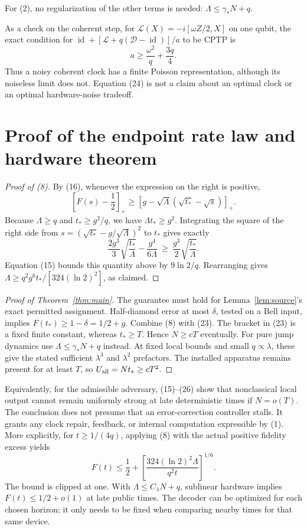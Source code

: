 \documentclass[11pt]{article}
\newcommand{\id}{\operatorname{id}}
\newcommand{\D}{\mathcal D}
\begin{document}
For (2), no regularization of the other terms is needed:
\(\Lambda\leq\gamma_*N+q\).

As a check on the coherent step, for
\(\mathcal L(X)=-i[\omega Z/2,X]\) on one qubit, the exact condition for
\(\id+[\mathcal L+q(\D-\id)]/a\) to be CPTP is
\[
 a\geq\frac{\omega^2}{q}+\frac{3q}{4}.
 \tag{24}
\]
Thus a noisy coherent clock has a finite Poisson representation, although
its noiseless limit does not. Equation (24) is not a claim about an
optimal clock or an optimal hardware-noise tradeoff.

\section{Proof of the endpoint rate law and hardware theorem}

\begin{proof}[Proof of (8)]
By (16), whenever the expression on the right is positive,
\[
 \left[F(s)-\frac12\right]_+
    \geq \left[g-\sqrt{\Lambda}(\sqrt{t_*}-\sqrt s)\right]_+.
 \tag{25}
\]
Because \(\Lambda\geq q\) and \(t_*\geq g^2/q\), we have
\(\Lambda t_*\geq g^2\). Integrating the square of the right side
from \(s=(\sqrt{t_*}-g/\sqrt{\Lambda})^2\) to \(t_*\) gives exactly
\[
 \frac{2g^3}{3}\sqrt{\frac{t_*}{\Lambda}}
             -\frac{g^4}{6\Lambda}
 \ \geq\ \frac{g^3}{2}\sqrt{\frac{t_*}{\Lambda}}.
 \tag{26}
\]
Equation (15) bounds this quantity above by \(9\ln2/q\).
Rearranging gives
\(\Lambda\geq q^2g^6t_*/[324(\ln2)^2]\), as claimed.
\end{proof}

\begin{proof}[Proof of Theorem~\ref{thm:main}]
The guarantee must hold for Lemma~\ref{lem:source}'s exact permitted
assignment. Half-diamond error at most \(\delta\), tested on a Bell
input, implies \(F(t_*)\geq1-\delta=1/2+g\).
Combine (8) with (23). The bracket in (23) is a fixed finite constant,
whereas \(t_*\geq T\). Hence \(N\geq cT\) eventually.
For pure jump dynamics use \(\Lambda\leq\gamma_*N+q\) instead.
At fixed local bounds and small \(q\propto\lambda\), these give the
stated sufficient \(\lambda^3\) and \(\lambda^2\) prefactors.
The installed apparatus remains present for at least \(T\), so
\(U_{\rm all}=Nt_*\geq cT^2\).
\end{proof}

Equivalently, for the admissible adversary, (15)--(26) show that
nonclassical local output cannot remain uniformly strong at late
deterministic times if \(N=o(T)\). The conclusion does not presume
that an error-correction controller stalls. It grants any clock
repair, feedback, or internal computation expressible by (1).
More explicitly, for \(t\geq1/(4q)\), applying (8) with the actual
positive fidelity excess yields
\[
 F(t)\leq\frac12+
       \left[\frac{324(\ln2)^2\Lambda}{q^2t}\right]^{1/6}.
 \tag{27}
\]
The bound is clipped at one. With \(\Lambda\leq C_\lambda N+q\),
sublinear hardware implies \(F(t)\leq1/2+o(1)\) at late public times.
The decoder can be optimized for each chosen horizon; it only needs
to be fixed when comparing nearby times for that same device.
\end{document}
